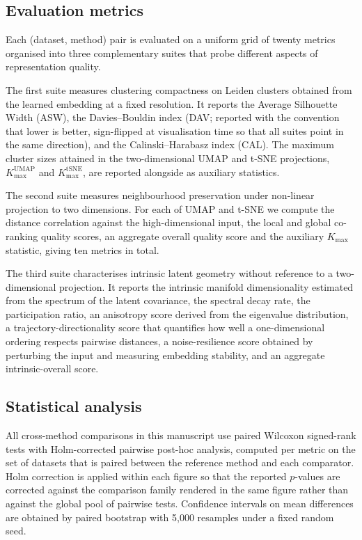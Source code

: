 \documentclass[referee, pdflatex, sn-vancouver-num]{sn-jnl}
\begin{document}
\subsection{Evaluation metrics}\label{sec:metrics}

Each (dataset, method) pair is evaluated on a uniform grid of twenty metrics organised into three complementary suites that probe different aspects of representation quality.

The first suite measures clustering compactness on Leiden clusters obtained from the learned embedding at a fixed resolution. It reports the Average Silhouette Width (ASW), the Davies--Bouldin index (DAV; reported with the convention that lower is better, sign-flipped at visualisation time so that all suites point in the same direction), and the Calinski--Harabasz index (CAL). The maximum cluster sizes attained in the two-dimensional UMAP and t-SNE projections, $K_{\max}^{\text{UMAP}}$ and $K_{\max}^{\text{tSNE}}$, are reported alongside as auxiliary statistics.

The second suite measures neighbourhood preservation under non-linear projection to two dimensions. For each of UMAP and t-SNE we compute the distance correlation against the high-dimensional input, the local and global co-ranking quality scores, an aggregate overall quality score and the auxiliary $K_{\max}$ statistic, giving ten metrics in total.

The third suite characterises intrinsic latent geometry without reference to a two-dimensional projection. It reports the intrinsic manifold dimensionality estimated from the spectrum of the latent covariance, the spectral decay rate, the participation ratio, an anisotropy score derived from the eigenvalue distribution, a trajectory-directionality score that quantifies how well a one-dimensional ordering respects pairwise distances, a noise-resilience score obtained by perturbing the input and measuring embedding stability, and an aggregate intrinsic-overall score.

\subsection{Statistical analysis}\label{sec:stats}

All cross-method comparisons in this manuscript use paired Wilcoxon signed-rank tests with Holm-corrected pairwise post-hoc analysis, computed per metric on the set of datasets that is paired between the reference method and each comparator. Holm correction is applied within each figure so that the reported $p$-values are corrected against the comparison family rendered in the same figure rather than against the global pool of pairwise tests. Confidence intervals on mean differences are obtained by paired bootstrap with 5{,}000 resamples under a fixed random seed.
\end{document}
